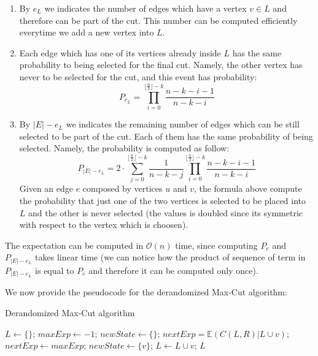 \documentclass[11pt,a4paper]{article}
\newcommand{\floor}[1]{\lfloor #1 \rfloor}
\newcommand{\ceil}[1]{\lceil #1 \rceil}
\begin{document}
\begin{enumerate}
\item By $e_L$ we indicates the number of edges which have a vertex $v \in L$ and therefore can be part of the cut. This number can be computed efficiently everytime we add a new vertex into $L$.
\item Each edge which has one of its vertices already inside $L$ has the same probability to being selected for the final
cut. Namely, the other vertex has never to be selected for the cut, and this event has probability:
\begin{equation}
P_{e_L}= \prod_{i=0}^{\floor{\frac{n}{2}}-k} \frac{n-k-i-1}{n-k-i}
\end{equation} 
\item By $|E|-e_L$ we indicates the remaining number of edges which can be still selected to be part of the cut. Each
of them has the same probability of being selected. Namely, the probability is computed as follow:
\begin{equation}
P_{|E|-e_L} = 2 \cdot \sum_{j=0}^{\floor{\frac{n}{2}}-k}\frac{1}{n-k-j}\prod_{i=0}^{\floor{\frac{n}{2}}-k} \frac{n-k-i-1}{n-k-i}
\end{equation}
Given an edge $e$ composed by vertices $u$ and $v$, the formula above compute the probability that just one of the
two vertices is selected to be placed into $L$ and the other is never selected (the values is doubled since its symmetric with 
respect to the vertex which is choosen). 
\end{enumerate}
The expectation can be computed in $\mathcal{O}(n)$ time, since computing $P_e$ and $P_{|E|-e_L}$ takes linear time
(we can notice how the product of sequence of term in $P_{|E|-e_L}$ is equal to $P_e$ and therefore it can be 
computed only once).
\smallskip

We now provide the pseudocode for the derandomized Max-Cut algorithm:
\begin{algorithm}
\caption{Derandomized Max-Cut algorithm}
\begin{algorithmic}[1]
\State $L \gets \{ \}$;
\For{$i=0$ to $\ceil{\frac{n}{2}}$}
	\State $maxExp \gets -1$;	
	\State $newState \gets \{\}$;	
		\State $nextExp = \mathbb{E}(C(L,R)|L\cup {v})$; 	
			\State $nextExp \gets maxExp$;
			\State $newState \gets \{v\}$;
		\EndIf	
	\EndFor
	\State $L \gets L \cup {v}$;
\EndFor
\State \Return $L$
\EndFunction
\end{algorithmic}
\end{algorithm}
\end{document}
